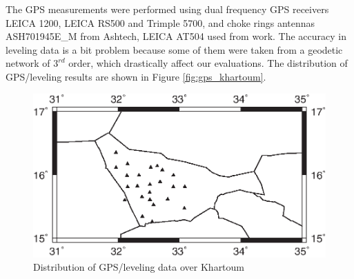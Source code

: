 The GPS measurements were performed using dual frequency GPS receivers LEICA 1200, LEICA RS500 and Trimple 5700, and choke rings antennas ASH701945E\_M from Ashtech, LEICA AT504  used from \citet{ahmed_msc} work. The accuracy in leveling data is a bit problem because some of them were taken from a geodetic network of $3^{rd}$ order, which drastically affect our evaluations. The distribution of GPS/leveling results are shown in Figure \ref{fig:gps_khartoum}.

\begin{figure}[t]
	\caption{Distribution of GPS/leveling data over Khartoum}
	\label{sudan_data}
	\includegraphics{Figures/points_dist_krt}
	\centering
\end{figure}


